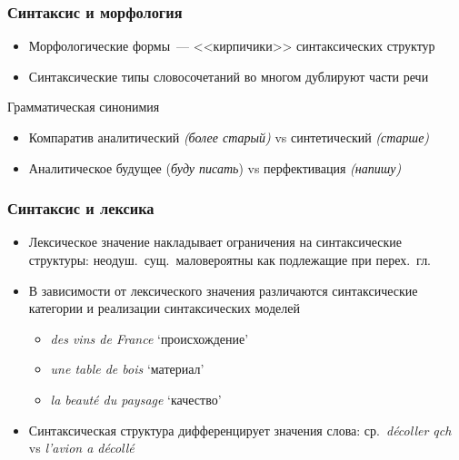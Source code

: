\begin{frame}
  \frametitle{Синтаксис и морфология}

  \begin{itemize}
    \item Морфологические формы~--- <<кирпичики>> синтаксических структур
    \item Синтаксические типы словосочетаний во многом дублируют части речи
  \end{itemize}

  \vfill

  \begin{block}{Грамматическая синонимия}
    \begin{itemize}
      \item Компаратив аналитический \textit{(более старый)} vs синтетический \textit{(старше)}
      \item Аналитическое будущее (\textit{буду писать}) vs перфективация \textit{(напишу)}
    \end{itemize}
  \end{block}
\end{frame}

\begin{frame}
  \frametitle{Синтаксис и лексика}

  \begin{itemize}
    \item Лексическое значение накладывает ограничения на синтаксические структуры: неодуш.\ сущ.\ маловероятны как подлежащие при перех.\ гл.
    \item В зависимости от лексического значения различаются синтаксические категории и реализации синтаксических моделей \begin{itemize}
      \item \textit{des vins de France} `происхождение'
      \item \textit{une table de bois} `материал'
      \item \textit{la beauté du paysage} `качество'
    \end{itemize}
    \item Синтаксическая структура дифференцирует значения слова: ср.\ \textit{décoller qch} vs \textit{l'avion a décollé}
  \end{itemize}
\end{frame}

